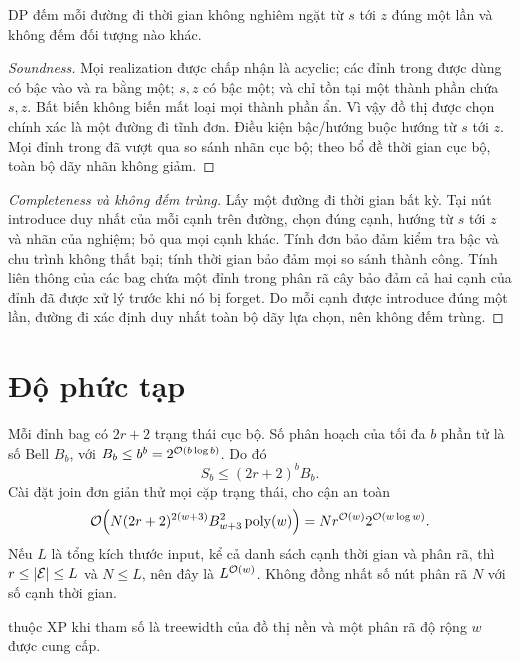 \begin{theorem}
DP đếm mỗi đường đi thời gian không nghiêm ngặt từ $s$ tới $z$ đúng một lần và không đếm đối tượng nào khác.
\end{theorem}

\begin{proof}[Soundness]
Mọi realization được chấp nhận là acyclic; các đỉnh trong được dùng có bậc vào và ra bằng một; $s,z$ có bậc một; và chỉ tồn tại một thành phần chứa $s,z$. Bất biến không biến mất loại mọi thành phần ẩn. Vì vậy đồ thị được chọn chính xác là một đường đi tĩnh đơn. Điều kiện bậc/hướng buộc hướng từ $s$ tới $z$. Mọi đỉnh trong đã vượt qua so sánh nhãn cục bộ; theo bổ đề thời gian cục bộ, toàn bộ dãy nhãn không giảm.
\end{proof}

\begin{proof}[Completeness và không đếm trùng]
Lấy một đường đi thời gian bất kỳ. Tại nút introduce duy nhất của mỗi cạnh trên đường, chọn đúng cạnh, hướng từ $s$ tới $z$ và nhãn của nghiệm; bỏ qua mọi cạnh khác. Tính đơn bảo đảm kiểm tra bậc và chu trình không thất bại; tính thời gian bảo đảm mọi so sánh thành công. Tính liên thông của các bag chứa một đỉnh trong phân rã cây bảo đảm cả hai cạnh của đỉnh đã được xử lý trước khi nó bị forget. Do mỗi cạnh được introduce đúng một lần, đường đi xác định duy nhất toàn bộ dãy lựa chọn, nên không đếm trùng.
\end{proof}

\section{Độ phức tạp}

Mỗi đỉnh bag có $2r+2$ trạng thái cục bộ. Số phân hoạch của tối đa $b$ phần tử là số Bell $B_b$, với $B_b\le b^b=2^{\mathcal{O}(b\log b)}$. Do đó
\[
  S_b\le(2r+2)^bB_b.
\]
Cài đặt join đơn giản thử mọi cặp trạng thái, cho cận an toàn
\[
  \mathcal{O}\!\left(N(2r+2)^{2(w+3)}B_{w+3}^2\operatorname{poly}(w)\right)
  =Nr^{\mathcal{O}(w)}2^{\mathcal{O}(w\log w)}.
\]
Nếu $L$ là tổng kích thước input, kể cả danh sách cạnh thời gian và phân rã, thì $r\le |\mathcal{E}|\le L$ và $N\le L$, nên đây là $L^{\mathcal{O}(w)}$. Không đồng nhất số nút phân rã $N$ với số cạnh thời gian.

\begin{corollary}
\TP{} thuộc XP khi tham số là treewidth của đồ thị nền và một phân rã độ rộng $w$ được cung cấp.
\end{corollary}

